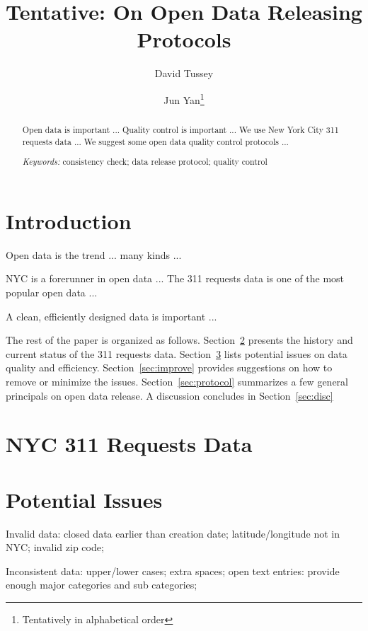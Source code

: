 \documentclass[12pt, titlepage]{article}
\title{Tentative: On Open Data Releasing Protocols}
\date{}
\author[1]{David Tussey}
\author[2]{Jun Yan\thanks{Tentatively in alphabetical order}}
\affil[1]{Independent Researcher?}
\affil[2]{Department of Statistics, University of Connecticut}
\numberwithin{equation}{section}
\begin{document}
\maketitle


\begin{abstract}
  Open data is important ...
  Quality control is important ...
  We use New York City 311 requests data  ...
  We suggest some open data quality control protocols ...


\bigskip
  
\noindent
{\it Keywords:}
consistency check;    
data release protocol;
quality control
\end{abstract}


\doublespacing

\section{Introduction} \label{sec:intro}

Open data is the trend ... many kinds \citep[e.g.,][]{cdc2022} ...


NYC is a forerunner in open data ... The 311 requests data is one of the most
popular open data ...


A clean, efficiently designed data is important ...


The rest of the paper is organized as follows.
Section~\ref{sec:data} presents the history and current status of the 311
requests data. Section~\ref{sec:issues} lists potential issues on data quality
and efficiency.
Section~\ref{sec:improve} provides suggestions on how to remove or minimize the
issues.
Section~\ref{sec:protocol} summarizes a few general principals on open data
release.
A discussion concludes in Section~\ref{sec:disc}


\section{NYC 311 Requests Data} \label{sec:data}



\section{Potential Issues} \label{sec:issues}

Invalid data: closed data earlier than creation date;
latitude/longitude not in NYC; invalid zip code;


Inconsistent data: upper/lower cases; extra spaces; 
open text entries: provide enough major categories and sub categories;
\end{document}
